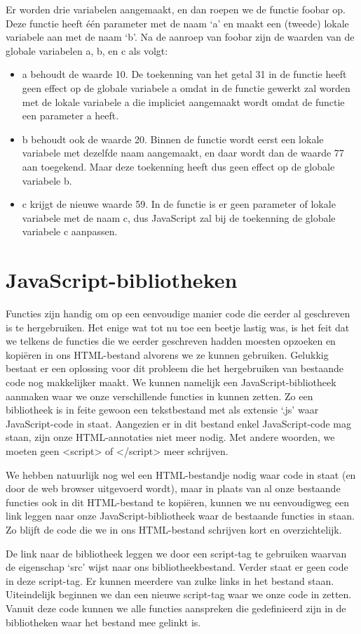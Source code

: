 Er worden drie variabelen aangemaakt, en dan roepen we de functie foobar op. Deze functie heeft \'e\'en parameter met de naam `a' en maakt een (tweede) lokale variabele aan met de naam `b'. Na de aanroep van foobar zijn de waarden van de globale variabelen a, b, en c als volgt:
\begin{itemize}
  \item a behoudt de waarde 10. De toekenning van het getal 31 in de functie heeft geen effect op de globale variabele a omdat in de functie gewerkt zal worden met de lokale variabele a die impliciet aangemaakt wordt omdat de functie een parameter a heeft.
  \item b behoudt ook de waarde 20. Binnen de functie wordt eerst een lokale variabele met dezelfde naam aangemaakt, en daar wordt dan de waarde 77 aan toegekend. Maar deze toekenning heeft dus geen effect op de globale variabele b.
  \item c krijgt de nieuwe waarde 59. In de functie is er geen parameter of lokale variabele met de naam c, dus JavaScript zal bij de toekenning de globale variabele c aanpassen.
\end{itemize}

\section{JavaScript-bibliotheken}

Functies zijn handig om op een eenvoudige manier code die eerder al geschreven is te hergebruiken. Het enige wat tot nu toe een beetje lastig was, is het feit dat we telkens de functies die we eerder geschreven hadden moesten opzoeken en kopi\"eren in ons HTML-bestand alvorens we ze kunnen gebruiken. Gelukkig bestaat er een oplossing voor dit probleem die het hergebruiken van bestaande code nog makkelijker maakt. We kunnen namelijk een JavaScript-bibliotheek aanmaken waar we onze verschillende functies in kunnen zetten. Zo een bibliotheek is in feite gewoon een tekstbestand met als extensie `.js' waar JavaScript-code in staat. Aangezien er in dit bestand enkel JavaScript-code mag staan, zijn onze HTML-annotaties niet meer nodig. Met andere woorden, we moeten geen <script> of </script> meer schrijven.

We hebben natuurlijk nog wel een HTML-bestandje nodig waar code in staat (en door de web browser uitgevoerd wordt), maar in plaats van al onze bestaande functies ook in dit HTML-bestand te kopi\"eren, kunnen we nu eenvoudigweg een link leggen naar onze JavaScript-bibliotheek waar de bestaande functies in staan. Zo blijft de code die we in ons HTML-bestand schrijven kort en overzichtelijk.


De link naar de bibliotheek leggen we door een script-tag te gebruiken waarvan de eigenschap `src' wijst naar ons bibliotheekbestand. Verder staat er geen code in deze script-tag. Er kunnen meerdere van zulke links in het bestand staan. Uiteindelijk beginnen we dan een nieuwe script-tag waar we onze code in zetten. Vanuit deze code kunnen we alle functies aanspreken die gedefinieerd zijn in de bibliotheken waar het bestand mee gelinkt is.

